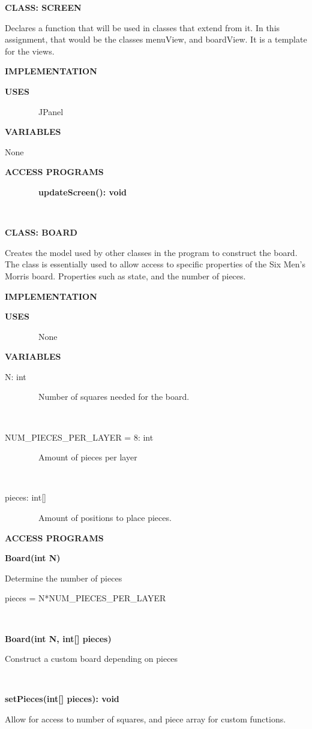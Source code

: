 \documentclass{article}
\begin{document}
{{\textbf{CLASS: SCREEN}}

{Declares a function that will be used in classes that extend from it. In this assignment, that would be the classes menuView, and boardView. It is a template for the views. }

{\textbf{IMPLEMENTATION}}

{\textbf{USES}}

{~~~~~~~~JPanel}

{\textbf{VARIABLES}}

{None}

{\textbf{ACCESS PROGRAMS}}

{~~~~~~~~\textbf{updateScreen(): void}}

{~~~~~~~~}

{\textbf{CLASS: BOARD}}

{Creates the model used by other classes in the program to construct the board. The class is essentially used to allow access to specific properties of the Six Men's Morris board. Properties such as state, and the number of pieces. }

{\textbf{IMPLEMENTATION}}

{\textbf{USES}}

{~~~~~~~~None}

{\textbf{VARIABLES}}

{N: int}

{~~~~~~~~Number of squares needed for the board.}

{~}

{NUM\_PIECES\_PER\_LAYER = 8: int}

{~~~~~~~~Amount of pieces per layer}

{~}

{pieces: int{[}{]}}

{~~~~~~~~Amount of positions to place pieces.}

{}

{\textbf{ACCESS PROGRAMS}}

{\textbf{Board(int N)}}

{Determine the number of pieces}

{pieces = N*NUM\_PIECES\_PER\_LAYER}

{~}

{\textbf{Board(int N, int{[}{]} pieces)}}

{Construct a custom board }{depending on }{pieces }

{~}

{\textbf{setPieces(int{[}{]} pieces): void}}

{Allow for access to number of squares, and piece array for custom functions.}

}
\end{document}
